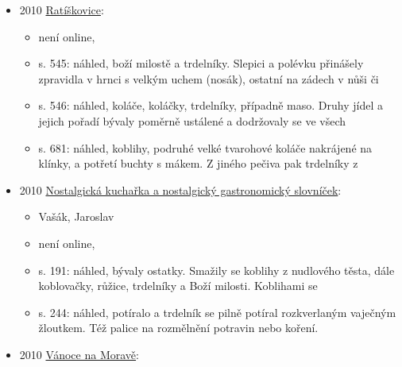 \begin{itemize}
  \begin{itemize}
  \tightlist
  \item
    není online, 
  \item
    s. 351: náhled, hospodyně smažily koblihy, Boží milosti nebo z
    litého těsta motýlky a pekly manžety - úzké pásky z trdelníkového
    těsta pečené na
  \item
    s. 365: náhled, milosti a pekly trdelníky, kousky z odpalovaného
    těsta a makové bábovky. Dnes se chystá největší sortiment cukroví na
    hody
  \end{itemize}
\item
  2010
  \href{https://ceskadigitalniknihovna.cz/uuid/uuid:eb53abf0-80d8-11e7-b92d-005056827e51}{Ratíškovice}:

  \begin{itemize}
  \tightlist
  \item
    není online, 
  \item
    s. 545: náhled, boží milostě a trdelníky. Slepici a polévku
    přinášely zpravidla v hrnci s velkým uchem (nosák), ostatní na
    zádech v nůši či
  \item
    s. 546: náhled, koláče, koláčky, trdelníky, případně maso. Druhy
    jídel a jejich pořadí bývaly poměrně ustálené a dodržovaly se ve
    všech
  \item
    s. 681: náhled, koblihy, podruhé velké tvarohové koláče nakrájené na
    klínky, a potřetí buchty s mákem. Z jiného pečiva pak trdelníky z
  \end{itemize}
\item
  2010
  \href{https://ceskadigitalniknihovna.cz/uuid/uuid:46f5c8f0-d962-11ef-8f57-005056827e51}{Nostalgická
  kuchařka a nostalgický gastronomický slovníček}:

  \begin{itemize}
  \tightlist
  \item
    Vašák, Jaroslav
  \item
    není online, 
  \item
    s. 191: náhled, bývaly ostatky. Smažily se koblihy z nudlového
    těsta, dále koblovačky, růžice, trdelníky a Boží milosti. Koblihami
    se
  \item
    s. 244: náhled, potíralo a trdelník se pilně potíral rozkverlaným
    vaječným žloutkem. Též palice na rozmělnění potravin nebo koření.
  \end{itemize}
\item
  2010
  \href{https://ceskadigitalniknihovna.cz/uuid/uuid:ed1ed830-6889-11e8-8470-005056827e52}{Vánoce
  na Moravě}:


\end{itemize}
